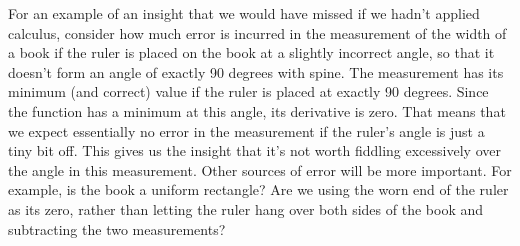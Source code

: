 For an example of an insight that we would have missed if we hadn't applied calculus,
consider how much error is incurred in the measurement of the width of a book if the ruler is
placed on the book at a slightly incorrect angle, so that it doesn't form an angle of exactly 90 degrees with
spine. The measurement has its minimum (and correct) value if the ruler is placed at exactly
90 degrees. Since the function has a minimum at this angle, its derivative is zero. That means that
we expect essentially no error in the measurement if the ruler's angle is just a tiny bit off.
This gives us the insight that it's not worth fiddling excessively over the angle in this measurement.
Other sources of error will be more important. For example, is the book a uniform rectangle? Are we using
the worn end of the ruler as its zero, rather than letting the ruler hang over both sides of the book
and subtracting the two measurements?


